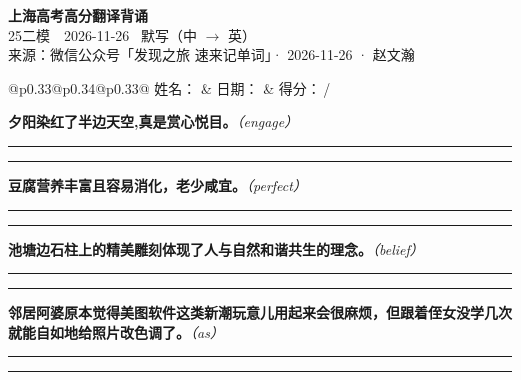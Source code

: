\documentclass[11pt,a4paper]{article}
\newcommand{\num}[1]{\makebox[1.9em][r]{#1.}\hspace{0.3em}}
\newcommand{\wline}{\noindent\rule{\linewidth}{0.4pt}}
\newcommand{\prompt}[1]{\emph{\textcolor{tipblue}{\small（#1）}}}
\begin{document}
\pagestyle{plain}
\begin{center}
{\LARGE\bfseries 上海高考高分翻译背诵 }\\[0.25em]
{\large 25二模　2026-11-26 \quad\ 默写（中 $\to$ 英）}\\[0.35em]
{\footnotesize 来源：微信公众号「发现之旅 速来记单词」· 2026-11-26 · 赵文瀚}
\end{center}

\vspace{0.4em}
\noindent\begin{tabular}{@{}p{0.33\textwidth}@{}p{0.34\textwidth}@{}p{0.33\textwidth}@{}}
姓名：\underline{\hspace{2.0cm}} & 日期：\underline{\hspace{2.0cm}} & 得分：\underline{\hspace{1.4cm}}\,/ \\
\end{tabular}

\vspace{0.5em}

\vspace{0.8em}
\num{1}\textbf{夕阳染红了半边天空,真是赏心悦目。}\prompt{engage}

\vspace{0.3em}

\wline\vspace{0.3em}
\wline

\num{2}\textbf{豆腐营养丰富且容易消化，老少咸宜。}\prompt{perfect}

\vspace{0.3em}

\wline\vspace{0.3em}
\wline

\num{3}\textbf{池塘边石柱上的精美雕刻体现了人与自然和谐共生的理念。}\prompt{belief}

\vspace{0.3em}

\wline\vspace{0.3em}
\wline

\num{4}\textbf{邻居阿婆原本觉得美图软件这类新潮玩意儿用起来会很麻烦，但跟着侄女没学几次就能自如地给照片改色调了。}\prompt{as}

\vspace{0.3em}

\wline\vspace{0.3em}
\wline
\end{document}
